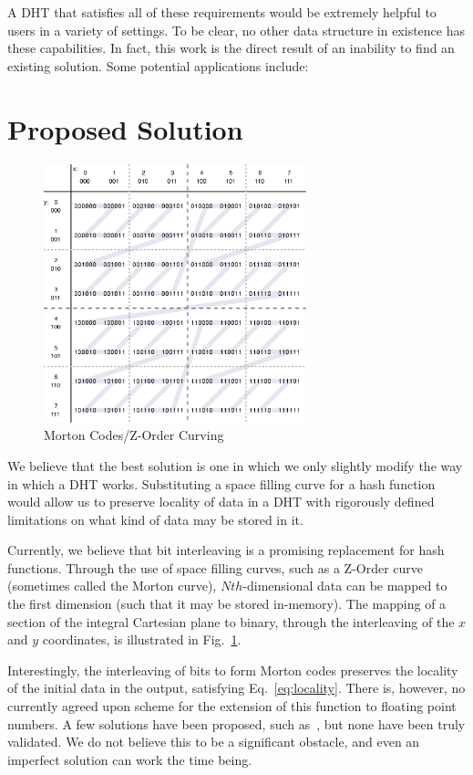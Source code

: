 \documentclass[12pt]{IEEEtran}
\begin{document}
{\par A DHT that satisfies all of these requirements would be extremely helpful to users in a variety of settings. To be clear, no other data structure in existence has these capabilities. In fact, this work is the direct result of an inability to find an existing solution. Some potential applications include:



\section{Proposed Solution}
\begin{figure}[!t]
\centering
\includegraphics[width=3in]{ZCurve}
\caption{Morton Codes/Z-Order Curving}
\label{fig_MCode}
\end{figure}

\par We believe that the best solution is one in which we only slightly modify the way in which a DHT works. Substituting a space filling curve for a hash function would allow us to preserve locality of data in a DHT with rigorously defined limitations on what kind of data may be stored in it.

\par Currently, we believe that bit interleaving is a promising replacement for hash functions. Through the use of space filling curves, such as a Z-Order curve (sometimes called the Morton curve), $Nth$-dimensional data can be mapped to the first dimension (such that it may be stored in-memory). The mapping of a section of the integral Cartesian plane to binary, through the interleaving of the $x$ and $y$ coordinates, is illustrated in Fig.~\ref{fig_MCode}.

\par Interestingly, the interleaving of bits to form Morton codes preserves the locality of the initial data in the output, satisfying Eq.~\ref{eq:locality}. There is, however, no currently agreed upon scheme for the extension of this function to floating point numbers. A few solutions have been proposed, such as~\cite{Connor:2010eq}, but none have been truly validated. We do not believe this to be a significant obstacle, and even an imperfect solution can work the time being.

}
\end{document}
